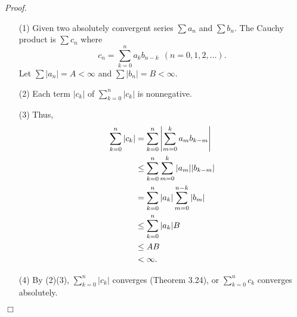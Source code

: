 \documentclass{article}
\begin{document}
\emph{Proof.}
\begin{enumerate}
\item[(1)]
Given two absolutely convergent series $\sum a_n$ and $\sum b_n$.
The Cauchy product is $\sum c_n$
where
$$c_n = \sum_{k=0}^{n} a_k b_{n-k} \:\: (n=0,1,2,\ldots).$$
Let $\sum |a_n| = A < \infty$ and $\sum |b_n| = B < \infty$.
\item[(2)]
Each term $|c_k|$ of $\sum_{k=0}^{n}|c_k|$ is nonnegative.
\item[(3)]
Thus,
\begin{align*}
  \sum_{k=0}^{n}|c_k|
  &= \sum_{k=0}^{n} \abs{ \sum_{m=0}^{k} a_m b_{k-m} } \\
  &\leq \sum_{k=0}^{n} \sum_{m=0}^{k} |a_m| |b_{k-m}| \\
  &= \sum_{k=0}^{n} |a_k| \sum_{m=0}^{n-k} |b_m| \\
  &\leq \sum_{k=0}^{n} |a_k| B \\
  &\leq AB \\
  &< \infty.
\end{align*}
\item[(4)]
By (2)(3), $\sum_{k=0}^{n}|c_k|$ converges (Theorem 3.24),
or $\sum_{k=0}^{n} c_k$ converges absolutely.
\end{enumerate}
$\Box$ \\\\



\end{document}
